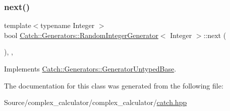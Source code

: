 \mbox{\label{class_catch_1_1_generators_1_1_random_integer_generator_aaa3db70fbdfa3e8dcb61fb5592eba81f}} 
\subsubsection{\texorpdfstring{next()}{next()}}
{\footnotesize\ttfamily template$<$typename Integer $>$ \\
bool \mbox{\hyperlink{class_catch_1_1_generators_1_1_random_integer_generator}{Catch\+::\+Generators\+::\+Random\+Integer\+Generator}}$<$ Integer $>$\+::next (\begin{DoxyParamCaption}{ }\end{DoxyParamCaption})\hspace{0.3cm}{\ttfamily [inline]}, {\ttfamily [override]}, {\ttfamily [virtual]}}



Implements \mbox{\hyperlink{class_catch_1_1_generators_1_1_generator_untyped_base_aeed3c0cd6233c5f553549e453b8d6638}{Catch\+::\+Generators\+::\+Generator\+Untyped\+Base}}.



The documentation for this class was generated from the following file\+:\begin{DoxyCompactItemize}
\item 
Source/complex\+\_\+calculator/complex\+\_\+calculator/\mbox{\hyperlink{catch_8hpp}{catch.\+hpp}}\end{DoxyCompactItemize}
